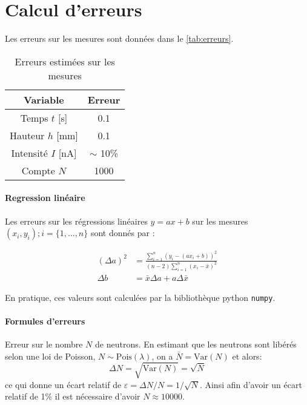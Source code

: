 \section{Calcul d'erreurs}
\label{sec:erreurs}

Les erreurs sur les mesures sont données dans le \autoref{tab:erreurs}.

\begin{table}[h]
    \centering
    \begin{tabulary}{\textwidth}{C C}
        \toprule
        Variable & Erreur \\
        \midrule
        Temps \(t\) [s] & 0.1 \\
        Hauteur \(h\) [mm] & 0.1 \\
        Intensité \(I\) [nA] & $\sim$ 10\% \\
        Compte $N$ & 1000 \\
        \bottomrule
    \end{tabulary}
    \caption{Erreurs estimées sur les mesures}
    \label{tab:erreurs}
\end{table}

\paragraph*{Regression linéaire}
Les erreurs sur les régressions linéaires \(y = ax + b\) sur les mesures \((x_i, y_i) ; i = \{1, \dots, n\}\) sont donnés par \cite{erreursmesure}:

\begin{equation}
    \label{eq:erreur:fit}
    \begin{aligned}
        (\Delta a)^2 &= \frac{\sum_{i=1}^{n}(y_i - (a x_i + b))^2}{(n-2) \sum_{i=1}^{n}(x_i - \bar{x})^2}\\
        \Delta b &= \bar{x} \Delta a + a \Delta \bar{x}
    \end{aligned}
\end{equation}

En pratique, ces valeurs sont calculées par la bibliothèque python \texttt{numpy}.

\paragraph*{Formules d'erreurs}

Erreur sur le nombre $N$ de neutrons. En estimant que les neutrons sont libérés selon une loi de Poisson, \(N \sim \textrm{Pois}(\lambda)\), on a \(\bar N = \textrm{Var}(N)\) et alors:
\begin{equation}
    \Delta N = {\sqrt{\textrm{Var}(N)}} = \sqrt{N}
\end{equation}
ce qui donne un écart relatif de $\varepsilon = \Delta N/N = 1/\sqrt{N}$. Ainsi afin d'avoir un écart relatif de 1\% il est nécessaire d'avoir $N\approx10 000$.

